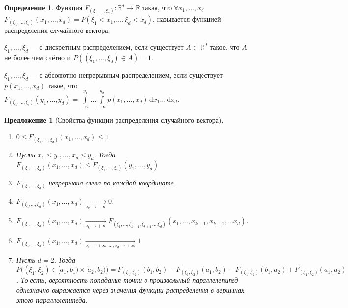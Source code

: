 \documentclass[11pt,openany,a4paper]{scrartcl}
\theoremstyle{plain}
\newtheorem{proposition}[theorem]{Предложение}
\theoremstyle{definition}
\newtheorem{definition}[theorem]{Определение}
\newcommand\mb{\mathbb}
\newcommand\real{\mb R}
\newcommand{\underto}[1]{\xrightarrow[#1]{}}
\newcommand{\dif}{\, \mathrm d}
\begin{document}
\begin{definition}
    Функция $F_{(\xi_1, \ldots, \xi_d)}: \real^d \to \real$ такая, что
    $\forall x_1, \ldots, x_d$ $F_{(\xi_1, \ldots, \xi_d)}(x_1, \ldots, x_d) =
    P(\xi_1 < x_1, \ldots, \xi_d < x_d)$, называется функцией распределения
    случайного вектора.
\end{definition}

$\xi_1, \ldots, \xi_d$ — с дискретным распределением, если существует $A \subset 
\real^d$ такое, что $A$ не более чем счётно и
$P((\xi_1, \ldots, \xi_d) \in A) = 1$.

$\xi_1, \ldots, \xi_d$ — с абсолютно непрерывным распределением, если существует
$p(x_1, \ldots, x_d)$ такое, что $F_{(\xi_1, \ldots, \xi_d)}(y_1, \ldots, y_d) =
\int\limits_{-\infty}^{y_1} \ldots \int\limits_{-\infty}^{y_d}
p(x_1, \ldots, x_d) \dif x_1 \ldots \dif x_d$.

\begin{proposition}[Свойства функции распределения случайного вектора]
\mbox{}
    \begin{enumerate}
        \item  $0 \leqslant F_{(\xi_1, \ldots, \xi_d)}(x_1, \ldots, x_d)
        \leqslant 1$
        \item Пусть $x_1 \leqslant y_1, \ldots, x_d \leqslant y_d$.
        Тогда $F_{(\xi_1, \ldots, \xi_d)}(x_1, \ldots, x_d) \leqslant
        F_{(\xi_1, \ldots, \xi_d)}(y_1, \ldots, y_d)$
        \item $F_{(\xi_1, \ldots, \xi_d)}$ непрерывна слева по каждой координате.
        \item $F_{(\xi_1, \ldots, \xi_d)}(x_1, \ldots, x_d)
        \underto{x_k \to -\infty} 0$.
        \item $F_{(\xi_1, \ldots, \xi_d)}(x_1, \ldots, x_d)
        \underto{x_k \to +\infty}
        F_{(\xi_1, \ldots, \xi_{k-1}, \xi_{k+1}, \ldots \xi_d)}
        (x_1, \ldots, x_{k-1}, x_{k+1}, \ldots x_d)$.
        \item $F_{(\xi_1, \ldots, \xi_d)}(x_1, \ldots, x_d)
        \underto{x_1 \to +\infty, \ldots, x_d \to +\infty} 1$
        \item Пусть $d = 2$. Тогда
        $P\big((\xi_1, \xi_2) \in [a_1, b_1) \times [a_2, b_2)\big) =
        F_{(\xi_1, \xi_2)}(b_1, b_2) - F_{(\xi_1, \xi_2)}(a_1, b_2) -
        F_{(\xi_1, \xi_2)}(b_1, a_2) + F_{(\xi_1, \xi_2)}(a_1, a_2)$. То есть, 
        вероятность попадания точки в произвольный параллелепипед
        однозначно выражается 
        через значения функции распределения в вершинах этого параллелепипеда.
    \end{enumerate}
\end{proposition}
\end{document}
